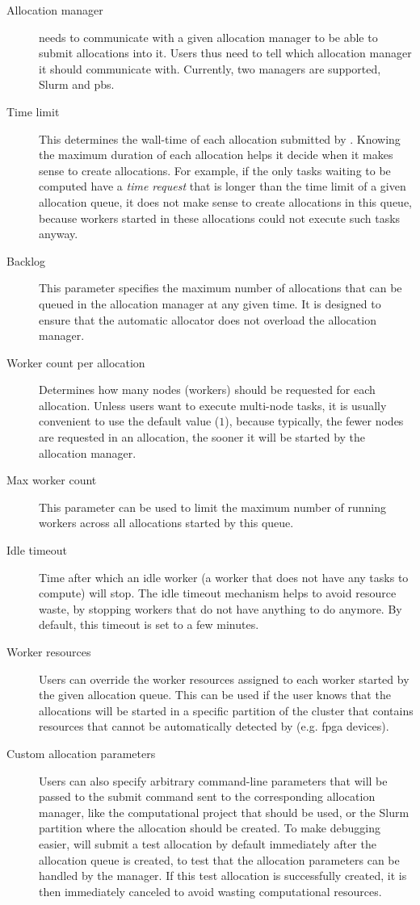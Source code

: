 \begin{description}
	\item[Allocation manager] \Autoalloc{} needs to communicate with a given allocation manager
		to be able to submit allocations into it. Users thus need to tell \hq{} which
		allocation manager it should communicate with. Currently, two managers are supported, Slurm and
		\gls{pbs}.
	\item[Time limit] This determines the wall-time of each allocation submitted by \autoalloc{}. Knowing the
		maximum duration of each allocation helps it decide when it makes sense to create allocations. For
		example, if the only tasks waiting to be computed have a \emph{time request} that is longer than
		the time limit of a given allocation queue, it does not make sense to create allocations in this
		queue, because workers started in these allocations could not execute such tasks anyway.
	\item[Backlog] This parameter specifies the maximum number of allocations that can be queued in the allocation
		manager at any given time. It is designed to ensure that the automatic allocator does not overload
		the allocation manager.
	\item[Worker count per allocation] Determines how many nodes (workers) should be requested for each allocation. Unless users want to
		execute multi-node tasks, it is usually convenient to use the default value
		($1$), because typically, the fewer nodes are requested in an allocation, the
		sooner it will be started by the allocation manager.
	\item[Max worker count] This parameter can be used to limit the maximum number of running workers across all allocations
		started by this queue.
	\item[Idle timeout] Time after which an idle worker (a worker that does not have any tasks to compute) will stop. The
		idle timeout mechanism helps to avoid resource waste, by stopping workers that do not have anything
		to do anymore. By default, this timeout is set to a few minutes.
	\item[Worker resources] Users can override the worker resources assigned to each worker started by the given allocation
		queue. This can be used if the user knows that the allocations will be started in a specific
		partition of the cluster that contains resources that cannot be automatically detected by
		\hyperqueue{} (e.g. \gls{fpga} devices).
	\item[Custom allocation parameters] Users can also specify arbitrary command-line parameters that will be passed to the submit command
		sent to the corresponding allocation manager, like the computational project that should be used,
		or the Slurm partition where the allocation should be created. To make debugging easier,
		\hyperqueue{} will submit a test allocation by default immediately after the allocation
		queue is created, to test that the allocation parameters can be handled by the manager. If this
		test allocation is successfully created, it is then immediately canceled to avoid wasting
		computational resources.
\end{description}

